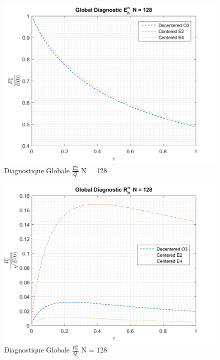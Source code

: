 \documentclass{article}
\begin{document}
\begin{figure}[H]
    \centering
    \includegraphics[scale=0.45]{img/fig7b.png}
    \caption{Diagnostique Globale $\frac{E_h^n}{Q}$ N = 128}
    \label{fig7b}
\end{figure}
\begin{figure}[H]
    \centering
    \includegraphics[scale=0.45]{img/fig7c.png}
    \caption{Diagnostique Globale $\frac{R_h^n}{Q}$ N = 128}
    \label{fig7c}
\end{figure}

\newpage
\end{document}

